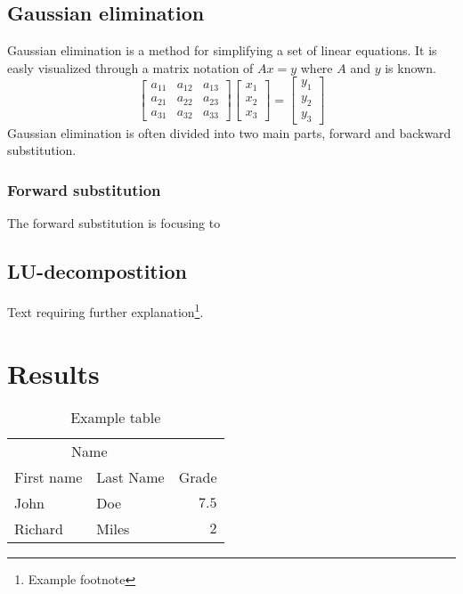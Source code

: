 \documentclass[twoside,twocolumn]{article}
\begin{document}
\subsection{Gaussian elimination}
Gaussian elimination is a method for simplifying a set of linear equations. It is easly visualized through a matrix notation of $Ax = y$ where $A$ and $y$ is known.
\begin{equation}
\begin{bmatrix}
a_11 & a_12 & a_13\\
a_21 & a_22 & a_23\\
a_31 & a_32 & a_33
\end{bmatrix} 
\begin{bmatrix}
x_1 \\ x_2 \\ x_3
\end{bmatrix}=
\begin{bmatrix}
y_1 \\ y_2 \\ y_3
\end{bmatrix}
\end{equation}
Gaussian elimination is often divided into two main parts, forward and backward substitution.
\subsubsection{Forward substitution}
The forward substitution is focusing to 
\subsection{LU-decompostition}

Text requiring further explanation\footnote{Example footnote}.


\section{Results}

\begin{table}[p]
\caption{Example table}
\centering
\begin{tabular}{llr}
\toprule
\multicolumn{2}{c}{Name} \\
\cmidrule(r){1-2}
First name & Last Name & Grade \\
\midrule
John & Doe & $7.5$ \\
Richard & Miles & $2$ \\
\bottomrule
\end{tabular}
\end{table}
\end{document}
